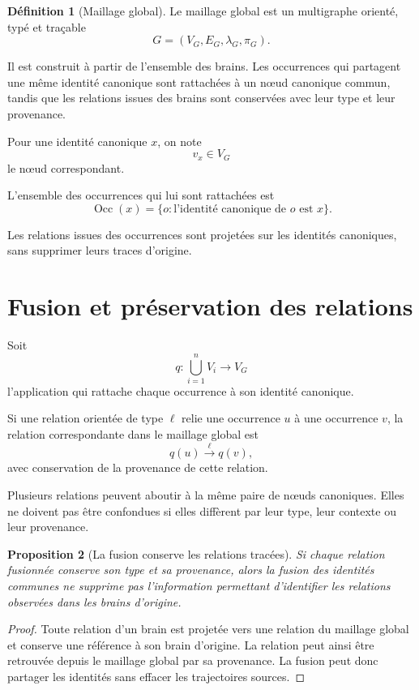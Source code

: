 \documentclass[11pt,a4paper]{report}
\theoremstyle{definition}
\newtheorem{definition}{Définition}[chapter]
\theoremstyle{plain}
\newtheorem{proposition}[definition]{Proposition}
\theoremstyle{remark}
\newcommand{\Occ}{\operatorname{Occ}}
\begin{document}
\begin{definition}[Maillage global]
Le maillage global est un multigraphe orienté, typé et traçable
\[
G=(V_G,E_G,\lambda_G,\pi_G).
\]

Il est construit à partir de l'ensemble des brains. Les occurrences
qui partagent une même identité canonique sont rattachées à un
nœud canonique commun, tandis que les relations issues des brains
sont conservées avec leur type et leur provenance.
\end{definition}

Pour une identité canonique \(x\), on note
\[
v_x\in V_G
\]
le nœud correspondant.

L'ensemble des occurrences qui lui sont rattachées est
\[
\Occ(x)=
\{o:\text{l'identité canonique de }o\text{ est }x\}.
\]

Les relations issues des occurrences sont projetées sur les
identités canoniques, sans supprimer leurs traces d'origine.

\section{Fusion et préservation des relations}

Soit
\[
q: \bigcup_{i=1}^{n}V_i\longrightarrow V_G
\]
l'application qui rattache chaque occurrence à son identité
canonique.

Si une relation orientée de type \(\ell\) relie une occurrence
\(u\) à une occurrence \(v\), la relation correspondante dans
le maillage global est
\[
q(u)\overset{\ell}{\longrightarrow}q(v),
\]
avec conservation de la provenance de cette relation.

Plusieurs relations peuvent aboutir à la même paire de nœuds
canoniques. Elles ne doivent pas être confondues si elles diffèrent
par leur type, leur contexte ou leur provenance.

\begin{proposition}[La fusion conserve les relations tracées]
Si chaque relation fusionnée conserve son type et sa provenance,
alors la fusion des identités communes ne supprime pas
l'information permettant d'identifier les relations observées
dans les brains d'origine.
\end{proposition}

\begin{proof}
Toute relation d'un brain est projetée vers une relation du
maillage global et conserve une référence à son brain d'origine.
La relation peut ainsi être retrouvée depuis le maillage global
par sa provenance. La fusion peut donc partager les identités
sans effacer les trajectoires sources.
\end{proof}
\end{document}
